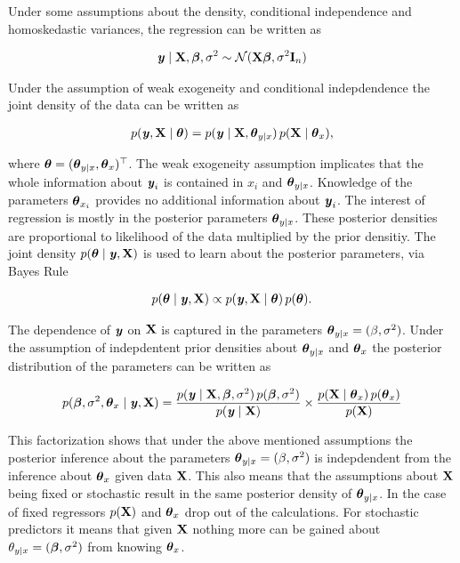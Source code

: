 \documentclass[11pt,a4paper,twoside]{book}
\begin{document}
Under some assumptions about the density, conditional independence and homoskedastic variances, the regression can be written as

       \begin{align} 
{\textbf{\textit{y}}} \mid {\mathbf{X}} , {\boldsymbol{\beta}}, \sigma^2 \sim \mathcal{N}({\mathbf{X}} {\boldsymbol{\beta}} , \sigma^2 {\mathbf{I}}_{n})
   \end{align}

Under the assumption of weak exogeneity and conditional indepdendence the joint density of the data can be written as

       \begin{align} 
p({\textbf{\textit{y}}}, {\mathbf{X}} \mid {\boldsymbol{\theta}}{}) = p({\textbf{\textit{y}}} \mid {\mathbf{X}}, {\boldsymbol{\theta}}{}_{y \mid x}) \, p({\mathbf{X}} \mid {\boldsymbol{\theta}}{}_{x}),
   \end{align}

where ${\boldsymbol{\theta}}{} = ({\boldsymbol{\theta}}{}_{y \mid x}, {\boldsymbol{\theta}}{}_{x})^\top$. The weak exogeneity assumption implicates that the whole information about ${\textbf{\textit{y}}}_{i}$ is contained in $x_{i}$ and ${\boldsymbol{\theta}}{}_{y \mid x}$. Knowledge of the parameters ${\boldsymbol{\theta}}{}_{x_{i}}$ provides no additional information about ${\textbf{\textit{y}}}_{i}$.
The interest of regression is mostly in the posterior parameters ${\boldsymbol{\theta}}{}_{y \mid x}$. These posterior densities are proportional to  likelihood of the data  multiplied by the prior densitiy. The joint density $p({\boldsymbol{\theta}}{} \mid {\textbf{\textit{y}}}, {\mathbf{X}})$ is used to learn about the posterior parameters, via Bayes Rule

       \begin{align} 
p({\boldsymbol{\theta}}{} \mid {\textbf{\textit{y}}}, {\mathbf{X}}) \propto p({\textbf{\textit{y}}}, {\mathbf{X}} \mid  {\boldsymbol{\theta}}{}) \, p({\boldsymbol{\theta}}{}).
   \end{align}
   
   The dependence of ${\textbf{\textit{y}}}$ on ${\mathbf{X}}$ is captured in the parameters ${\boldsymbol{\theta}}{}_{y \mid x} = (\beta, \sigma^2)$. Under the assumption of indepdentent prior densities about ${\boldsymbol{\theta}}{}_{y \mid x}$ and ${\boldsymbol{\theta}}{}_{x}$ the posterior distribution of the parameters can be written as
   
          \begin{align} 
p({\boldsymbol{\beta}}, \sigma^2, {\boldsymbol{\theta}}{}_{x} \mid {\textbf{\textit{y}}}, {\mathbf{X}}) = \frac{p({\textbf{\textit{y}}} \mid {\mathbf{X}}, {\boldsymbol{\beta}}, \sigma^2) \, p({\boldsymbol{\beta}}, \sigma^2)}{p({\textbf{\textit{y}}} \mid {\mathbf{X}})} \times \frac{p({\mathbf{X}} \mid {\boldsymbol{\theta}}{}_{x}) \, p({\boldsymbol{\theta}}{}_{x})}{p({\mathbf{X}})}
   \end{align}
   
  This factorization shows that under the above mentioned assumptions the posterior inference about the parameters ${\boldsymbol{\theta}}{}_{y \mid x} = (\beta, \sigma^2)$ is indepdendent from the inference about ${\boldsymbol{\theta}}{}_{x}$ given data ${\mathbf{X}}$. This also means that the assumptions about ${\mathbf{X}}$ being fixed or stochastic result in the same posterior density of  ${\boldsymbol{\theta}}{}_{y \mid x}$. In the case of fixed regressors $p({\mathbf{X}})$ and ${\boldsymbol{\theta}}{}_{x}$ drop out of the calculations. For stochastic predictors it means that given ${\mathbf{X}}$ nothing more can be gained about $\theta_{y \mid x} = ({\boldsymbol{\beta}}, \sigma^2)$ from knowing ${\boldsymbol{\theta}}{}_{x}$. 
  
\end{document}
